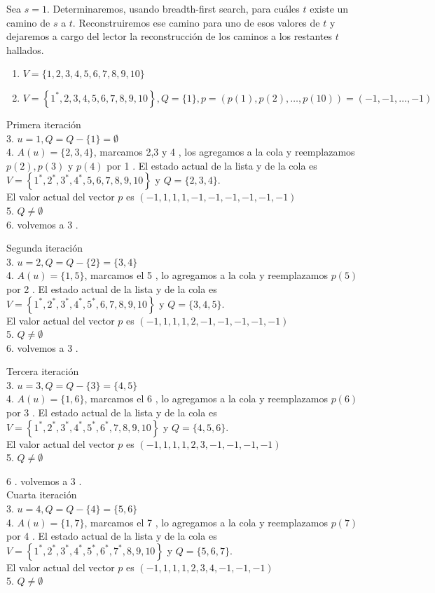 \documentclass[10pt]{article}
\begin{document}
Sea $s=1$. Determinaremos, usando breadth-first search, para cuáles $t$ existe un camino de $s$ a $t$. Reconstruiremos ese camino para uno de esos valores de $t$ y dejaremos a cargo del lector la reconstrucción de los caminos a los restantes $t$ hallados.

\begin{enumerate}
  \item $V=\{1,2,3,4,5,6,7,8,9,10\}$
  \item $V=\left\{1^{*}, 2,3,4,5,6,7,8,9,10\right\}, Q=\{1\}, p=(p(1), p(2), \ldots, p(10))=(-1,-1, \ldots,-1)$
\end{enumerate}

Primera iteración\\
3. $u=1, Q=Q-\{1\}=\emptyset$\\
4. $A(u)=\{2,3,4\}$, marcamos 2,3 y 4 , los agregamos a la cola y reemplazamos $p(2), p(3)$ y $p(4)$ por 1 . El estado actual de la lista y de la cola es\\
$V=\left\{1^{*}, 2^{*}, 3^{*}, 4^{*}, 5,6,7,8,9,10\right\}$ y $Q=\{2,3,4\}$.\\
El valor actual del vector $p$ es $(-1,1,1,1,-1,-1,-1,-1,-1,-1)$\\
5. $Q \neq \emptyset$\\
6. volvemos a 3 .

Segunda iteración\\
3. $u=2, Q=Q-\{2\}=\{3,4\}$\\
4. $A(u)=\{1,5\}$, marcamos el 5 , lo agregamos a la cola y reemplazamos $p(5)$ por 2 . El estado actual de la lista y de la cola es $V=\left\{1^{*}, 2^{*}, 3^{*}, 4^{*}, 5^{*}, 6,7,8,9,10\right\}$ y $Q=\{3,4,5\}$.\\
El valor actual del vector $p$ es $(-1,1,1,1,2,-1,-1,-1,-1,-1)$\\
5. $Q \neq \emptyset$\\
6. volvemos a 3 .

Tercera iteración\\
3. $u=3, Q=Q-\{3\}=\{4,5\}$\\
4. $A(u)=\{1,6\}$, marcamos el 6 , lo agregamos a la cola y reemplazamos $p(6)$ por 3 . El estado actual de la lista y de la cola es $V=\left\{1^{*}, 2^{*}, 3^{*}, 4^{*}, 5^{*}, 6^{*}, 7,8,9,10\right\}$ y $Q=\{4,5,6\}$.\\
El valor actual del vector $p$ es $(-1,1,1,1,2,3,-1,-1,-1,-1)$\\
5. $Q \neq \emptyset$

6 . volvemos a 3 .\\
Cuarta iteración\\
3. $u=4, Q=Q-\{4\}=\{5,6\}$\\
4. $A(u)=\{1,7\}$, marcamos el 7 , lo agregamos a la cola y reemplazamos $p(7)$ por 4 . El estado actual de la lista y de la cola es\\
$V=\left\{1^{*}, 2^{*}, 3^{*}, 4^{*}, 5^{*}, 6^{*}, 7^{*}, 8,9,10\right\}$ y $Q=\{5,6,7\}$.\\
El valor actual del vector $p$ es $(-1,1,1,1,2,3,4,-1,-1,-1)$\\
5. $Q \neq \emptyset$
\end{document}
